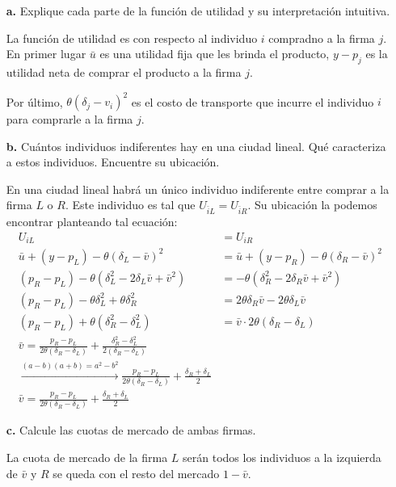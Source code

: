 \documentclass{exam}
\begin{document}
\begin{enumerate}
    \item[\textbf{a.}] Explique cada parte de la función de utilidad y su interpretación intuitiva.
    \begin{solution}
        La función de utilidad es con respecto al individuo $i$ compradno a la firma $j$. En primer lugar $\bar{u}$ es una utilidad fija que les brinda el producto, $y-p_j$ es la utilidad neta de comprar el producto a la firma $j$. 

        Por último, $\theta(\delta_j - v_i)^2$ es el costo de transporte que incurre el individuo $i$ para comprarle a la firma $j$. 
    \end{solution}
    \item[\textbf{b.}] Cuántos individuos indiferentes hay en una ciudad lineal. Qué caracteriza a estos individuos. Encuentre su ubicación. 
    \begin{solution}
        En una ciudad lineal habrá un único individuo indiferente entre comprar a la firma $L$ o $R$. Este individuo es tal que $U_{\bar{i}L} = U_{\bar{i}R}$. Su ubicación la podemos encontrar planteando tal ecuación:
        \begin{align*}
    U_{iL} &= U_{iR} \\ 
    \bar{u} + (y-p_L) - \theta (\delta_L - \bar{v})^2 &= \bar{u} + (y-p_R) - \theta (\delta_R - \bar{v})^2 \\
    (p_R - p_L) - \theta (\delta _L ^2 - 2\delta_L \bar{v} + \bar{v}^2) &= - \theta (\delta_R^2-2\delta_R \bar{v} + \bar{v}^2 ) \\
    (p_R - p_L) - \theta \delta_L^2 + \theta \delta_R^2 &= 2\theta \delta _R \bar{v} - 2\theta \delta_L \bar{v}  \\
    (p_R - p_L) + \theta (\delta_R^2 - \delta_L^2 ) &= \bar{v} \cdot 2\theta (\delta _R - \delta_L) \\
    \bar{v} = \frac{p_R-p_L}{2\theta (\delta_R-\delta_L)} + \frac{\delta_R^2 -\delta _L^2}{2(\delta_R-\delta_L)} \\
    \xrightarrow{(a-b)(a+b)= a^2 - b^2} \frac{p_R-p_L}{2\theta (\delta_R-\delta_L)} + \frac{\delta_R + \delta_L}{2} \\
    \boxed{\bar{v} = \frac{p_R-p_L}{2\theta (\delta_R-\delta_L)} + \frac{\delta_R + \delta_L}{2}}
    \end{align*}

    \end{solution}
    \item[\textbf{c.}] Calcule las cuotas de mercado de ambas firmas. 
    \begin{solution}
        La cuota de mercado de la firma $L$ serán todos los individuos a la izquierda de $\bar{v}$ y $R$ se queda con el resto del mercado $1-\bar{v}$.


\end{solution}
\end{enumerate}
\end{document}
